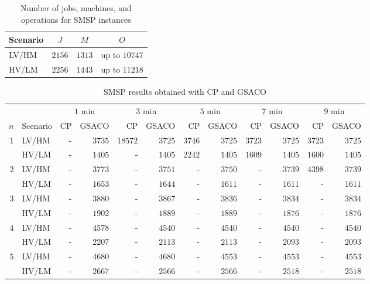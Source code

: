 \documentclass[runningheads]{llncs}
\begin{document}
\begin{table}[t]
\caption{Number of jobs, machines, and operations for SMSP instances}\label{tab:Dataset} \centering
\begin{tabular}{lccc}
	\hline
	Scenario & $J$    & $M$    & $O$              \\ \hline
	LV/HM    & $2156$ & $1313$ & up to $10747$    \\ 
	HV/LM    & $2256$ & $1443$ & up to $11218$    \\
	\hline
\end{tabular}
\end{table}
%
\begin{table}[t]
\caption{SMSP results obtained with CP and GSACO}\label{tab:results} \centering
\begin{tabular}{rlrrrrrrrrrr}
	\hline
	&
	&
	\multicolumn{2}{c}{$1$ min} &
	\multicolumn{2}{c}{$3$ min} &
	\multicolumn{2}{c}{$5$ min} &
	\multicolumn{2}{c}{$7$ min} &
	\multicolumn{2}{c}{$9$ min} \\ \cline{3-12} 
	$n$ & Scenario & CP & GSACO & CP & GSACO & CP & GSACO & CP & GSACO & CP & GSACO \\ \hline
	\multirow{2}{*}{$1$} & LV/HM & - & $3735$ & $18572$ & $3725$ & $3746$ & $3725$ & $3723$ & $3725$ & $3723$ & $3725$  \\
	& HV/LM & - & $1405$ & - & $1405$ & $2242$ & $1405$ & $1609$ & $1405$ & $1600$ & $1405$ \\
	\multirow{2}{*}{$2$} & LV/HM & - & $3773$ & - & $3751$ & - & $3750$ & - & $3739$ & $4398$ & $3739$ \\
	& HV/LM & - & $1653$ & - & $1644$ & - & $1611$ & - & $1611$ & - & $1611$   \\
	\multirow{2}{*}{$3$} & LV/HM & - & $3880$ & - & $3867$ & - & $3836$ & - & $3834$ & - & $3834$   \\
	& HV/LM & - & $1902$ & - & $1889$ & - & $1889$ & - & $1876$ & - & $1876$     \\
	\multirow{2}{*}{$4$} & LV/HM & - & $4578$ & - & $4540$ & - & $4540$ & - & $4540$ & - & $4540$     \\
	& HV/LM & - & $2207$ & - & $2113$ & - & $2113$ & - & $2093$ & - & $2093$  \\
	\multirow{2}{*}{$5$} & LV/HM & - & $4680$ & - & $4680$ & - & $4553$ & - & $4553$ & - & $4553$   \\	
	& HV/LM & - & $2667$ & - & $2566$ & - & $2566$ & - & $2518$ & - & $2518$ \\
	\hline  
\end{tabular}
\end{table}
\end{document}
